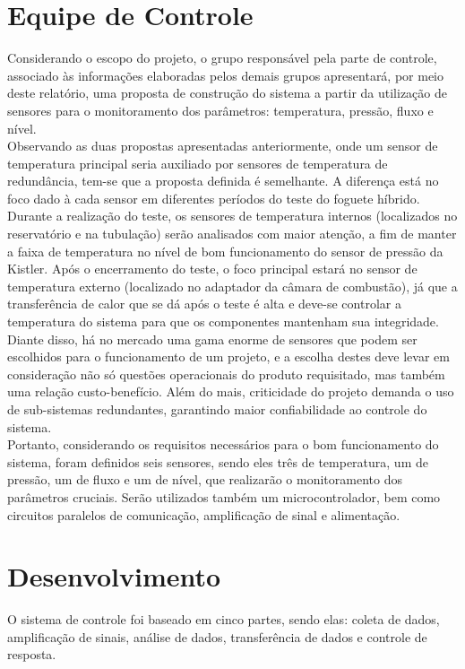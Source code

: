 \section{Equipe de Controle}
Considerando o escopo do projeto, o grupo responsável pela parte de controle, associado às informações elaboradas pelos demais grupos apresentará, por meio deste relatório, uma proposta de construção do sistema a partir da utilização de sensores para o monitoramento dos parâmetros: temperatura, pressão, fluxo e nível.\\
Observando as duas propostas apresentadas anteriormente, onde um sensor de temperatura principal seria auxiliado por sensores de temperatura de redundância, tem-se que a proposta definida é semelhante. A diferença está no foco dado à cada sensor em diferentes períodos do teste do foguete híbrido. Durante a realização do teste, os sensores de temperatura internos (localizados no reservatório e na tubulação) serão analisados com maior atenção, a fim de manter a faixa de temperatura no nível de bom funcionamento do sensor de pressão da Kistler. Após o encerramento do teste, o foco principal estará no sensor de temperatura externo (localizado no adaptador da câmara de combustão), já que a transferência de calor que se dá após o teste é alta e deve-se controlar a temperatura do sistema para que os componentes mantenham sua integridade.\\
Diante disso, há no mercado uma gama enorme de sensores que podem ser escolhidos para o funcionamento de um projeto, e a escolha destes deve levar em consideração não só questões operacionais do produto requisitado, mas também uma relação custo-benefício. Além do mais, criticidade do projeto demanda o uso de sub-sistemas redundantes, garantindo maior confiabilidade ao controle do sistema.\\
Portanto, considerando os requisitos necessários para o bom funcionamento do sistema, foram definidos seis sensores, sendo eles três de temperatura, um de pressão, um de fluxo e um de nível, que realizarão o monitoramento dos parâmetros cruciais. Serão utilizados também um microcontrolador, bem como circuitos paralelos de comunicação, amplificação de sinal e alimentação.\\
\section{Desenvolvimento}
O sistema de controle foi baseado em cinco partes, sendo elas: coleta de dados, amplificação de sinais, análise de dados, transferência de dados e controle de resposta.
